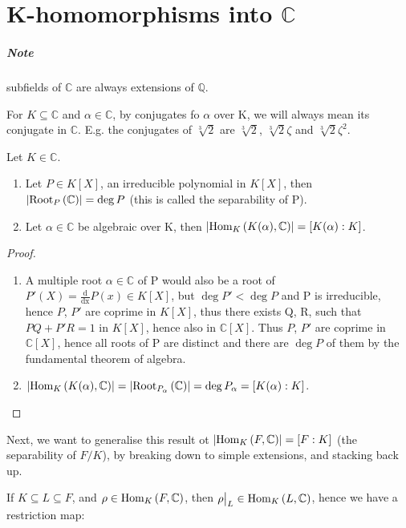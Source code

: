 
\section{K-homomorphisms into $\mathbb{C}$}

\subparagraph{Note}
subfields of $\mathbb{C}$ are always extensions of $\mathbb{Q}$.

For $K \subseteq \mathbb{C}$ and $\alpha \in \mathbb{C}$, by conjugates fo $\alpha$ over K, we will always mean its conjugate in $\mathbb{C}$. E.g. the conjugates of $\sqrt[3]{2}$ are $\sqrt[3]{2}$, $\sqrt[3]{2}\zeta$ and $\sqrt[3]{2}\zeta^2$.

\begin{proposition}\label{prop:15}
  Let $K \in \mathbb{C}$. 
  \begin{enumerate}
  \item Let $P \in K[X]$, an irreducible polynomial in $K[X]$, then $\cardinality{\rootset[P]{\mathbb{C}}} = \deg P$ (this is called the separability of P).
  \item Let $\alpha \in \mathbb{C}$ be algebraic over K, then $\cardinality{\homset[K]{K(\alpha)}{\mathbb{C}}} = [K(\alpha) : K]$.
  \end{enumerate}
\end{proposition}

\begin{proof}
  \begin{enumerate}
  \item A multiple root $\alpha \in \mathbb{C}$ of P would also be a root of $P'(X) = \frac{\text{d}}{\text{dx}}P(x) \in K[X]$, but $\deg P' < \deg P$ and P is irreducible, hence $P$, $P'$ are coprime in $K[X]$, thus there exists Q, R, such that $PQ + P'R = 1$ in $K[X]$, hence also in $\mathbb{C}[X]$. Thus $P$, $P'$ are coprime in $\mathbb{C}[X]$, hence all roots of P are distinct and there are $\deg P$ of them by the fundamental theorem of algebra.

  \item $\cardinality{\homset{K(\alpha)}{\mathbb{C}}} = \cardinality{\rootset[P_\alpha]{\mathbb{C}}} = \deg P_\alpha  = [K(\alpha) : K]$.
  \end{enumerate}
\end{proof}

Next, we want to generalise this result ot $\cardinality{\homset{F}{\mathbb{C}}} = [F : K]$ (the separability of $F/K$), by breaking down to simple extensions, and stacking back up.

If $K \subseteq L \subseteq F$, and $\rho \in \homset{F}{\mathbb{C}}$, then $\restr{\rho}{L} \in \homset{L}{\mathbb{C}}$, hence we have a restriction map:

